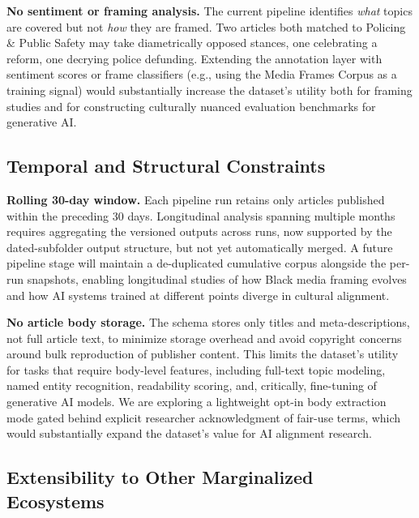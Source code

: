 \documentclass[letterpaper]{article}
\begin{document}
\textbf{No sentiment or framing analysis.} The current pipeline
identifies \emph{what} topics are covered but not \emph{how} they are
framed. Two articles both matched to Policing \& Public Safety may take
diametrically opposed stances, one celebrating a reform, one decrying
police defunding. Extending the annotation layer with sentiment scores
or frame classifiers (e.g., using the Media Frames Corpus
\citep{card2015} as a training signal) would substantially increase the
dataset's utility both for framing studies and for constructing
culturally nuanced evaluation benchmarks for generative AI.

\subsection{Temporal and Structural Constraints}

\textbf{Rolling 30-day window.} Each pipeline run retains only articles
published within the preceding 30 days. Longitudinal analysis spanning
multiple months requires aggregating the versioned outputs across runs,
now supported by the dated-subfolder output structure, but not yet
automatically merged. A future pipeline stage will maintain a
de-duplicated cumulative corpus alongside the per-run snapshots,
enabling longitudinal studies of how Black media framing evolves and
how AI systems trained at different points diverge in cultural
alignment.

\textbf{No article body storage.} The schema stores only titles and
meta-descriptions, not full article text, to minimize storage overhead
and avoid copyright concerns around bulk reproduction of publisher
content. This limits the dataset's utility for tasks that require
body-level features, including full-text topic modeling, named entity
recognition, readability scoring, and, critically, fine-tuning of
generative AI models. We are exploring a lightweight opt-in body
extraction mode gated behind explicit researcher acknowledgment of
fair-use terms, which would substantially expand the dataset's value for
AI alignment research.

\subsection{Extensibility to Other Marginalized Ecosystems}
\end{document}
